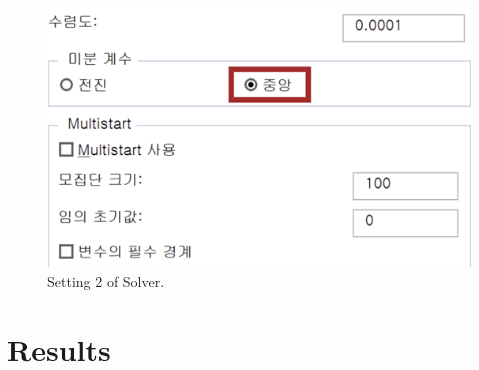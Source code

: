 \documentclass[11pt,twocolumn]{article}
\begin{document}
            \begin{figure}[h]
                    \centering
                    \includegraphics[width=.8\columnwidth]{Excel4.png}
                    \caption{Setting 2 of Solver.}
                    \label{setting2}
            \end{figure}
    \section{Results}
\end{document}
